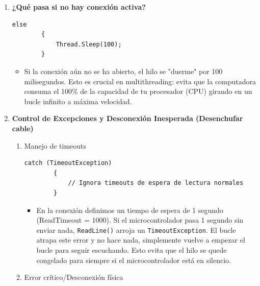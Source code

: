 \documentclass[
10pt, %
a4paper, %
oneside, %
headinclude,footinclude, %
BCOR5mm, %
]{scrartcl}
\begin{document}
\begin{enumerate}
\begin{lstlisting}[style=VSCodeDark]
	}
	\end{lstlisting}
	\begin{itemize}
		\item \textbf{Sincronización Inteligente:} El hilo analiza el texto recibido. Si la tarjeta le envía \texttt{"LED Encendido"}, el backend deduce que el pin físico está activo y le envía al frontend la orden de encender el LED virtual y la gráfica (\texttt{ReceiveLedState}, \texttt{true}). Lo mismo ocurre para \texttt{"apagado"}.
		\item Esto asegura que la interfaz web esté siempre sincronizada con la realidad de la placa, incluso si el cambio de estado fue provocado por el propio microcontrolador al iniciar o reiniciar.
	\end{itemize}
	\item \textbf{¿Qué pasa si no hay conexión activa?}
		\begin{lstlisting}[style=VSCodeDark]
		else
		{
			Thread.Sleep(100);
		}\end{lstlisting}
	\begin{itemize}
		\item Si la conexión aún no se ha abierto, el hilo se "duerme" por 100 milisegundos. Esto es crucial en multithreading: evita que la computadora consuma el 100\% de la capacidad de tu procesador (CPU) girando en un bucle infinito a máxima velocidad.
	\end{itemize}
	\item \textbf{Control de Excepciones y Desconexión Inesperada (Desenchufar cable)}
	\begin{enumerate}[label=\Alph*.]
		\item Manejo de timeouts
		\begin{lstlisting}[style=VSCodeDark]
		catch (TimeoutException)
		{
			// Ignora timeouts de espera de lectura normales
		}\end{lstlisting}
	\begin{itemize}
		\item En la conexión definimos un tiempo de espera de 1 segundo (ReadTimeout = 1000). Si el microcontrolador pasa 1 segundo sin enviar nada, \texttt{ReadLine()} arroja un \texttt{TimeoutException}. El bucle atrapa este error y no hace nada, simplemente vuelve a empezar el bucle para seguir escuchando. Esto evita que el hilo se quede congelado para siempre si el microcontrolador está en silencio.
	\end{itemize}
	\item Error crítico/Desconexión física
	\begin{lstlisting}[style=VSCodeDark]

\end{lstlisting}
\end{enumerate}
\end{enumerate}
\end{document}

